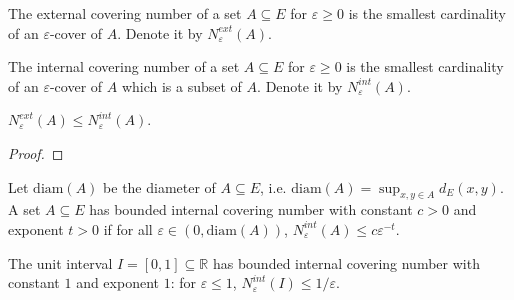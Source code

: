 \begin{definition}\label{def:externalCoveringNumber}
  \leanok
  The external covering number of a set $A \subseteq E$ for $\varepsilon \ge 0$ is the smallest cardinality of an $\varepsilon$-cover of $A$.
  Denote it by $N^{ext}_\varepsilon(A)$.
\end{definition}


\begin{definition}\label{def:internalCoveringNumber}
  \leanok
  The internal covering number of a set $A \subseteq E$ for $\varepsilon \ge 0$ is the smallest cardinality of an $\varepsilon$-cover of $A$ which is a subset of $A$.
  Denote it by $N^{int}_\varepsilon(A)$.
\end{definition}


\begin{lemma}\label{lem:externalCoveringNumber_le_internalCoveringNumber}
  \leanok
$N^{ext}_\varepsilon(A) \le N^{int}_\varepsilon(A)$.
\end{lemma}

\begin{proof}\leanok

\end{proof}


\begin{definition}\label{def:HasBoundedInternalCoveringNumber}
  \leanok
  Let $\mathrm{diam}(A)$ be the diameter of $A \subseteq E$, i.e. $\mathrm{diam}(A) = \sup_{x,y \in A} d_E(x, y)$.
  A set $A \subseteq E$ has bounded internal covering number with constant $c>0$ and exponent $t>0$ if for all $\varepsilon \in (0, \mathrm{diam}(A))$, $N^{int}_\varepsilon(A) \le c \varepsilon^{-t}$.
\end{definition}


\begin{lemma}\label{lem:hasBoundedInternalCoveringNumber_unitInterval}
The unit interval $I = [0, 1] \subseteq \mathbb{R}$ has bounded internal covering number with constant $1$ and exponent $1$: for $\varepsilon \le 1$, $N^{int}_\varepsilon(I) \le 1/\varepsilon$.
\end{lemma}

